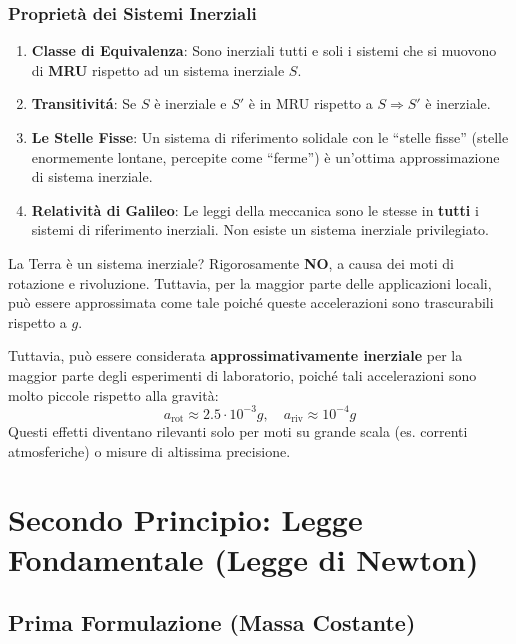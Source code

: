 \subsubsection{Proprietà dei Sistemi Inerziali}
\begin{enumerate}
    \item \textbf{Classe di Equivalenza}: Sono inerziali tutti e soli i sistemi che si muovono di \textbf{MRU} rispetto ad un sistema inerziale $S$.
    \item \textbf{Transitivitá}: Se $S$ è inerziale e $S'$ è in MRU rispetto a $S \Rightarrow S'$ è inerziale.
    \item \textbf{Le Stelle Fisse}: Un sistema di riferimento solidale con le ``stelle fisse'' (stelle enormemente lontane, percepite come ``ferme'') è un'ottima approssimazione di sistema inerziale.
    \item \textbf{Relatività di Galileo}: Le leggi della meccanica sono le stesse in \textbf{tutti} i sistemi di riferimento inerziali. Non esiste un sistema inerziale privilegiato.
\end{enumerate}

\begin{osservazione}{La Terra è un sistema inerziale?}
Rigorosamente \textbf{NO}, a causa dei moti di rotazione e rivoluzione. Tuttavia, per la maggior parte delle applicazioni locali, può essere approssimata come tale poiché queste accelerazioni sono trascurabili rispetto a $g$.
\end{osservazione}
Tuttavia, può essere considerata \textbf{approssimativamente inerziale} per la maggior parte degli esperimenti di laboratorio, poiché tali accelerazioni sono molto piccole rispetto alla gravità:
\begin{equation}
    a_{\text{rot}} \approx 2.5 \cdot 10^{-3} g, \quad a_{\text{riv}} \approx 10^{-4} g
\end{equation}
Questi effetti diventano rilevanti solo per moti su grande scala (es. correnti atmosferiche) o misure di altissima precisione.

\section{Secondo Principio: Legge Fondamentale (Legge di Newton)}

\subsection{Prima Formulazione (Massa Costante)}

